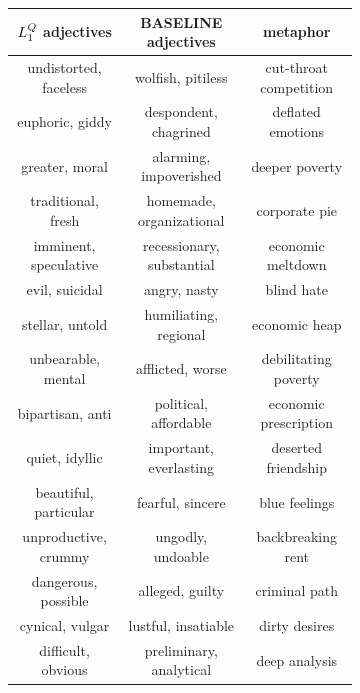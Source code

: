 \documentclass[9pt,twocolumn,twoside,lineno]{pnas-new}
\newcommand{\Listener}{L}
\newcommand{\QLONE}{\Listener_{{1}}^{{Q}}}
\begin{document}
	\begin{figure}
		\hspace{4em}
		\begin{subfigure}{0.3\textwidth}
			\begin{center}

			\setlength\extrarowheight{-10pt}
			\renewcommand{\arraystretch}{0.1}
			\begin{tabular}{ c | c | c  }
			 \tiny $\protect\QLONE$ adjectives & \tiny BASELINE adjectives & \tiny metaphor \\ 
			\hline
			\tiny undistorted, faceless & \tiny wolfish, pitiless & \tiny cut-throat competition\\
			\tiny euphoric, giddy & \tiny despondent, chagrined & \tiny deflated emotions\\
			\tiny greater, moral & \tiny alarming, impoverished & \tiny deeper poverty\\
			\tiny traditional, fresh & \tiny homemade, organizational & \tiny corporate pie\\
			\tiny imminent, speculative & \tiny recessionary, substantial & \tiny economic meltdown\\
			\tiny evil, suicidal & \tiny angry, nasty & \tiny blind hate\\
			\tiny stellar, untold & \tiny humiliating, regional & \tiny economic heap\\
			\tiny unbearable, mental & \tiny afflicted, worse & \tiny debilitating poverty\\
			\tiny bipartisan, anti & \tiny political, affordable & \tiny economic prescription\\
			\tiny quiet, idyllic & \tiny important, everlasting & \tiny deserted friendship\\
			\tiny beautiful, particular & \tiny fearful, sincere & \tiny blue feelings\\
			\tiny unproductive, crummy & \tiny ungodly, undoable & \tiny backbreaking rent\\
			\tiny dangerous, possible & \tiny alleged, guilty & \tiny criminal path\\
			\tiny cynical, vulgar & \tiny lustful, insatiable & \tiny dirty desires\\
			\tiny difficult, obvious & \tiny preliminary, analytical & \tiny deep analysis\\

\end{tabular}
\end{center}
\end{subfigure}
\end{figure}
\end{document}
